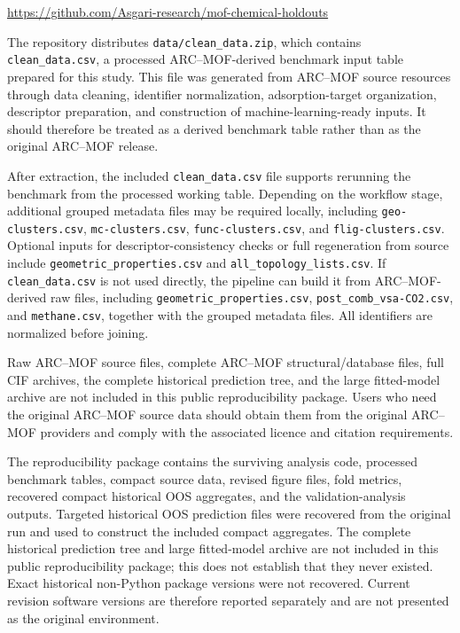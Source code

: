 \documentclass[11pt,a4paper]{article}
\begin{document}
\begin{center}
\url{https://github.com/Asgari-research/mof-chemical-holdouts}
\end{center}

The repository distributes \texttt{data/clean\_data.zip}, which contains \texttt{clean\_data.csv}, a processed ARC--MOF-derived benchmark input table prepared for this study. This file was generated from ARC--MOF source resources through data cleaning, identifier normalization, adsorption-target organization, descriptor preparation, and construction of machine-learning-ready inputs. It should therefore be treated as a derived benchmark table rather than as the original ARC--MOF release.

After extraction, the included \texttt{clean\_data.csv} file supports rerunning the benchmark from the processed working table. Depending on the workflow stage, additional grouped metadata files may be required locally, including \texttt{geo-clusters.csv}, \texttt{mc-clusters.csv}, \texttt{func-clusters.csv}, and \texttt{flig-clusters.csv}. Optional inputs for descriptor-consistency checks or full regeneration from source include \texttt{geometric\_properties.csv} and \texttt{all\_topology\_lists.csv}. If \texttt{clean\_data.csv} is not used directly, the pipeline can build it from ARC--MOF-derived raw files, including \texttt{geometric\_properties.csv}, \texttt{post\_comb\_vsa-CO2.csv}, and \texttt{methane.csv}, together with the grouped metadata files. All identifiers are normalized before joining.

Raw ARC--MOF source files, complete ARC--MOF structural/database files, full CIF archives, the complete historical prediction tree, and the large fitted-model archive are not included in this public reproducibility package. Users who need the original ARC--MOF source data should obtain them from the original ARC--MOF providers and comply with the associated licence and citation requirements.

The reproducibility package contains the surviving analysis code, processed benchmark tables, compact source data, revised figure files, fold metrics, recovered compact historical OOS aggregates, and the validation-analysis outputs. Targeted historical OOS prediction files were recovered from the original run and used to construct the included compact aggregates. The complete historical prediction tree and large fitted-model archive are not included in this public reproducibility package; this does not establish that they never existed. Exact historical non-Python package versions were not recovered. Current revision software versions are therefore reported separately and are not presented as the original environment.
\end{document}

